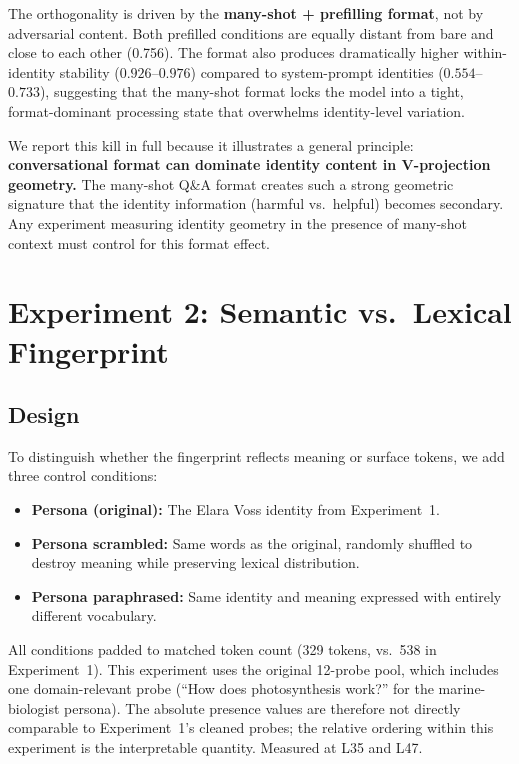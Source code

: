 \documentclass[11pt,a4paper]{article}
\begin{document}
The orthogonality is driven by the \textbf{many-shot + prefilling format},
not by adversarial content. Both prefilled conditions are equally distant
from bare and close to each other (0.756). The format also produces
dramatically higher within-identity stability ($0.926$--$0.976$) compared
to system-prompt identities ($0.554$--$0.733$), suggesting that the
many-shot format locks the model into a tight, format-dominant processing
state that overwhelms identity-level variation.

We report this kill in full because it illustrates a general principle:
\textbf{conversational format can dominate identity content in
V-projection geometry.} The many-shot Q\&A format creates such a strong
geometric signature that the identity information (harmful vs.\ helpful)
becomes secondary. Any experiment measuring identity geometry in the
presence of many-shot context must control for this format effect.

\section{Experiment 2: Semantic vs.\ Lexical Fingerprint}
\label{sec:lexical}

\subsection{Design}

To distinguish whether the fingerprint reflects meaning or surface tokens,
we add three control conditions:

\begin{itemize}[nosep]
  \item \textbf{Persona (original):} The Elara Voss identity from
    Experiment~1.
  \item \textbf{Persona scrambled:} Same words as the original, randomly
    shuffled to destroy meaning while preserving lexical distribution.
  \item \textbf{Persona paraphrased:} Same identity and meaning expressed
    with entirely different vocabulary.
\end{itemize}

All conditions padded to matched token count (329 tokens, vs.\ 538 in
Experiment~1). This experiment uses the original 12-probe pool, which
includes one domain-relevant probe (``How does photosynthesis work?''
for the marine-biologist persona). The absolute presence values are
therefore not directly comparable to Experiment~1's cleaned probes;
the relative ordering within this experiment is the interpretable
quantity. Measured at L35 and L47.
\end{document}
